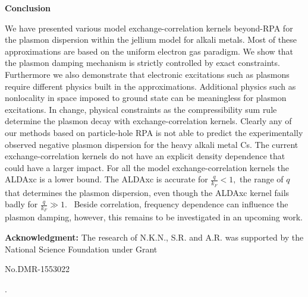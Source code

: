 \documentclass[12pt]{article}
\renewcommand{\_}{\kern-1.5pt\textunderscore\kern-1.5pt}
\begin{document}
\vspace{\baselineskip}
\setlength{\parskip}{0.0pt}
\setlength{\parskip}{9.96pt}

\vspace{\baselineskip}
\setlength{\parskip}{0.0pt}
\setlength{\parskip}{9.96pt}
\setlength{\parskip}{0.0pt}
\begin{justify}
\textbf{Conclusion }
\end{justify}\par


\vspace{\baselineskip}
\setlength{\parskip}{9.96pt}
\setlength{\parskip}{0.0pt}
\begin{justify}
We have presented various model exchange-correlation kernels beyond-RPA for the plasmon dispersion within the jellium model for alkali metals. Most of these approximations are based on the uniform electron gas paradigm. We show that the plasmon damping mechanism is strictly controlled by exact constraints. Furthermore we also demonstrate that electronic excitations such as plasmons require different physics built in the approximations. Additional physics such as nonlocality in space imposed to ground state can be meaningless for plasmon excitations. In change, physical constraints as the compressibility sum rule determine the plasmon decay with exchange-correlation kernels. Clearly any of our methods based on particle-hole RPA is not able to predict the experimentally observed negative plasmon dispersion for the heavy alkali metal Cs. The current exchange-correlation kernels do not have an explicit density dependence that could have a larger impact. For all the model exchange-correlation kernels the ALDAxc is a lower bound. The ALDAxc is accurate for  \( \frac{q}{k_{F}}<1, \)  the range of  \( q \)  that determines the plasmon dispersion, even though the ALDAxc kernel fails badly for  \( \frac{q}{k_{F}} \gg 1. \) \  Beside correlation, frequency dependence can influence the plasmon damping, however, this remains to be investigated in an upcoming work.
\end{justify}\par


\vspace{\baselineskip}
\setlength{\parskip}{9.96pt}

\vspace{\baselineskip}
\setlength{\parskip}{0.0pt}
\setlength{\parskip}{9.96pt}
\setlength{\parskip}{0.0pt}
\begin{justify}
\textbf{Acknowledgment:} The research of N.K.N., S.R. and A.R. was supported by the National Science Foundation under Grant {\fontsize{10pt}{12.0pt}\selectfont No.DMR-1553022\par}.
\end{justify}\par
\end{document}
